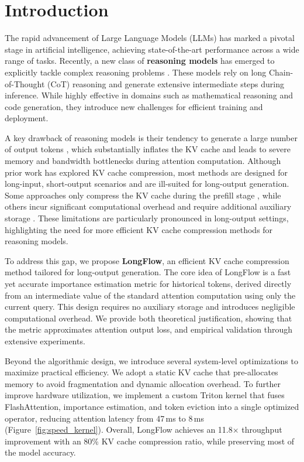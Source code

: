 \section{Introduction}
The rapid advancement of Large Language Models (LLMs) \citep{qwen2,llama3,gpt4o,deepseekv3} has marked a pivotal stage in artificial intelligence, achieving state-of-the-art performance across a wide range of tasks. Recently, a new class of \textbf{reasoning models} has emerged to explicitly tackle complex reasoning problems \citep{deepseekr1,openaio1,kimik1.5,qwen3,llama4}. These models rely on long Chain-of-Thought (CoT) reasoning and generate extensive intermediate steps during inference. While highly effective in domains such as mathematical reasoning and code generation, they introduce new challenges for efficient training and deployment.

A key drawback of reasoning models is their tendency to generate a large number of output tokens \citep{overthinking,overthinking1,speculativecot}, which substantially inflates the KV cache and leads to severe memory and bandwidth bottlenecks during attention computation. Although prior work has explored KV cache compression, most methods are designed for long-input, short-output scenarios and are ill-suited for long-output generation. Some approaches only compress the KV cache during the prefill stage \citep{snapkv,pyramidkv,calidrop}, while others incur significant computational overhead and require additional auxiliary storage \citep{h2o,vatp}. These limitations are particularly pronounced in long-output settings, highlighting the need for more efficient KV cache compression methods for reasoning models.

To address this gap, we propose \textbf{LongFlow}, an efficient KV cache compression method tailored for long-output generation. The core idea of LongFlow is a fast yet accurate importance estimation metric for historical tokens, derived directly from an intermediate value of the standard attention computation using only the current query. This design requires no auxiliary storage and introduces negligible computational overhead. We provide both theoretical justification, showing that the metric approximates attention output loss, and empirical validation through extensive experiments.

Beyond the algorithmic design, we introduce several system-level optimizations to maximize practical efficiency. We adopt a static KV cache that pre-allocates memory to avoid fragmentation and dynamic allocation overhead. To further improve hardware utilization, we implement a custom Triton kernel that fuses FlashAttention, importance estimation, and token eviction into a single optimized operator, reducing attention latency from 47\,ms to 8\,ms (Figure~\ref{fig:speed_kernel}). Overall, LongFlow achieves an 11.8$\times$ throughput improvement with an 80\% KV cache compression ratio, while preserving most of the model accuracy.


